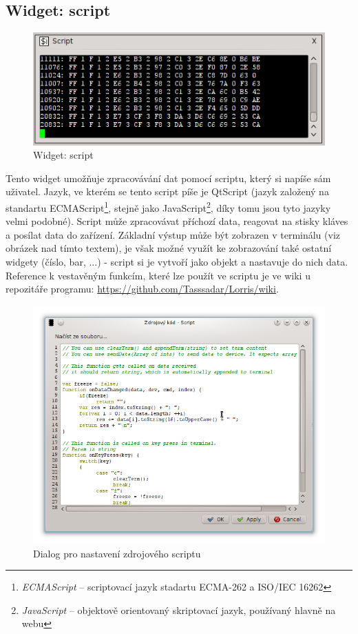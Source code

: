 \documentclass[12pt, a4paper, oneside]{article}
\newcommand{\It}{\textit}  %
\begin{document}
\subsection{Widget: script}
\begin{figure}[h]
\begin{center}
\includegraphics[scale=0.8]{img/w_script.png}
\caption{Widget: script}
\end{center}
\end{figure}
Tento widget umožňuje zpracovávání dat pomocí scriptu, který si napíše sám uživatel. Jazyk, ve kterém se tento script píše je QtScript (jazyk založený na standartu ECMAScript\footnote{\It{ECMAScript} -- scriptovací jazyk stadartu ECMA-262 a ISO/IEC 16262}, stejně jako JavaScript\footnote{\It{JavaScript} -- objektově orientovaný skriptovací jazyk, používaný hlavně na webu}, díky tomu jsou tyto jazyky velmi podobné). Script může zpracovávat příchozí data, reagovat na stisky kláves a posílat data do zařízení. Základní výstup může být zobrazen v terminálu (viz obrázek nad tímto textem), je však možné využít ke zobrazování také ostatní widgety (číslo, bar, ...) - script si je vytvoří jako objekt a nastavuje do nich data. Reference k vestavěným funkcím, které lze použít ve scriptu je ve wiki u repozitáře programu: \url{https://github.com/Tasssadar/Lorris/wiki}.
\begin{figure}[h]
\begin{center}
\includegraphics[scale=0.5]{img/w_script_src.png}
\caption{Dialog pro nastavení zdrojového scriptu}
\end{center}
\end{figure}
\end{document}
